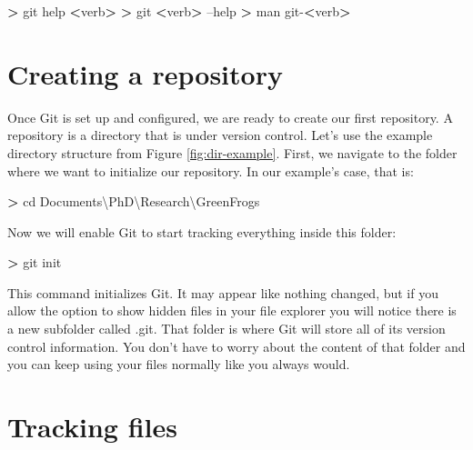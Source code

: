 \documentclass[
]{book}
\newenvironment{Shaded}{\begin{snugshade}}{\end{snugshade}}
\newcommand{\BuiltInTok}[1]{#1}
\newcommand{\FunctionTok}[1]{\textcolor[rgb]{0.00,0.00,0.00}{#1}}
\newcommand{\NormalTok}[1]{#1}
\newcommand{\OperatorTok}[1]{\textcolor[rgb]{0.81,0.36,0.00}{\textbf{#1}}}
\begin{document}
\begin{Shaded}
\begin{Highlighting}[]
\OperatorTok{>} \FunctionTok{git}\NormalTok{ help }\OperatorTok{<}\NormalTok{verb}\OperatorTok{>}
\OperatorTok{>} \FunctionTok{git} \OperatorTok{<}\NormalTok{verb}\OperatorTok{>}\NormalTok{ --help}
\OperatorTok{>} \FunctionTok{man}\NormalTok{ git-}\OperatorTok{<}\NormalTok{verb}\OperatorTok{>}
\end{Highlighting}
\end{Shaded}

\hypertarget{creating-a-repository}{%
\section{Creating a repository}\label{creating-a-repository}}

Once Git is set up and configured, we are ready to create our first repository. A repository is a directory that is under version control. Let's use the example directory structure from Figure \ref{fig:dir-example}. First, we navigate to the folder where we want to initialize our repository. In our example's case, that is:

\begin{Shaded}
\begin{Highlighting}[]
\OperatorTok{>} \BuiltInTok{cd}\NormalTok{ Documents\textbackslash{}PhD\textbackslash{}Research\textbackslash{}GreenFrogs}
\end{Highlighting}
\end{Shaded}

Now we will enable Git to start tracking everything inside this folder:

\begin{Shaded}
\begin{Highlighting}[]
\OperatorTok{>} \FunctionTok{git}\NormalTok{ init}
\end{Highlighting}
\end{Shaded}

This command initializes Git. It may appear like nothing changed, but if you allow the option to show hidden files in your file explorer you will notice there is a new subfolder called .git. That folder is where Git will store all of its version control information. You don't have to worry about the content of that folder and you can keep using your files normally like you always would.

\hypertarget{tracking-files}{%
\section{Tracking files}\label{tracking-files}}
\end{document}
